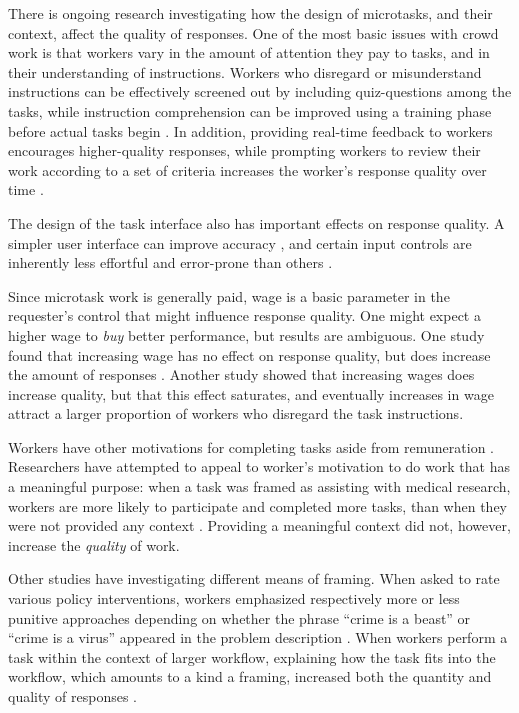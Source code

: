\documentclass{sigchi}
\begin{document}
There is ongoing research investigating how the design of microtasks,
and their context, affect the quality of responses.  
One of the most basic issues with crowd work
is that workers vary in the amount of attention they pay to tasks, 
and in their understanding of instructions.
Workers who disregard or misunderstand instructions can be effectively 
screened out by including quiz-questions among the tasks, while
instruction comprehension can be improved using a training phase before
actual tasks begin
\cite{le2010ensuring,kazai2013analysis}. %
In addition, providing real-time feedback to workers encourages  
higher-quality responses, while prompting workers to review their work
according to a set of criteria increases the worker's response quality 
over time \cite{Dow20121013}.

The design of the task interface also has important effects on response
quality.  A simpler user interface can improve accuracy 
\cite{Finnerty2013}, and certain input controls
are inherently less effortful and error-prone than others
\cite{cheng2015measuring}.

Since microtask work is generally paid, wage is a basic parameter in
the requester's control that might influence response quality.
One might expect a higher wage to \textit{buy} better performance,
but results are ambiguous.  One study found that increasing wage
has no effect on response quality, but does increase the amount of 
responses \cite{Mason200977}.
Another study \cite{kazai2013analysis} showed that increasing
wages does increase quality, but that this effect saturates, and 
eventually increases in wage attract a larger proportion of workers who 
disregard the task instructions.

Workers have other motivations for completing tasks aside from 
remuneration \cite{kazai2013analysis}.  
Researchers have attempted to appeal to
worker's motivation to do work that has a meaningful purpose:
when a task was framed as assisting with medical research,
workers are more likely to participate and completed more tasks, than
when they were not provided any context \cite{chandler2013breaking}.
Providing a meaningful context did not, however, increase the 
\textit{quality} of work.

Other studies have investigating different means of framing.  
When asked to rate various policy interventions, 
workers emphasized respectively more or less punitive approaches
depending on whether the phrase ``crime is a beast'' or 
``crime is a virus'' appeared in the problem description
\cite{thibodeau2013natural}.
When workers perform a task within the context of larger workflow, 
explaining how the task fits into the workflow, 
which amounts to a kind a framing, increased both the quantity and 
quality of responses \cite{Kinnaird2012281}.
\end{document}
